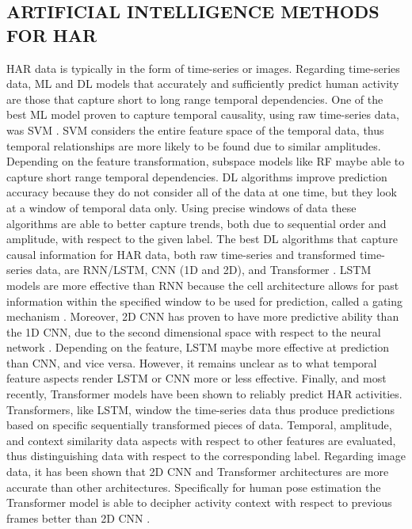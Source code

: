\documentclass{ieeeaccess}
\begin{document}
\subsection{ARTIFICIAL INTELLIGENCE METHODS FOR HAR}
HAR data is typically in the form of time-series or images. Regarding time-series data, ML and DL models that accurately and sufficiently predict human activity are those that capture short to long range temporal dependencies.  One of the best ML model proven to capture temporal causality, using raw time-series data, was SVM \cite{Anguita_2012_SVMHumanActivity, Xiao_2003_DeepLearning}. SVM considers the entire feature space of the temporal data, thus temporal relationships are more likely to be found due to similar amplitudes. Depending on the feature transformation, subspace models like RF maybe able to capture short range temporal dependencies. DL  algorithms improve prediction accuracy because they do not consider all of the data at one time, but they look at a window of temporal data only. Using precise windows of data these algorithms are able to better capture trends, both due to sequential order and amplitude, with respect to the given label.  The best DL algorithms that capture causal information for HAR data, both raw time-series and transformed time-series data, are RNN/LSTM, CNN (1D and 2D), and Transformer \cite{Xiao_2003_DeepLearning, Xia_2020_LSTMCNN, Dirgova_2022_Wearable}. LSTM models are more effective than RNN because the cell architecture allows for past information within the specified window to be used for prediction, called a gating mechanism \cite{Sarang_2021_Tensorflow2}.  Moreover, 2D CNN has proven to have more predictive ability than the 1D CNN, due to the second dimensional space with respect to the neural network \cite{Nedorubova_2021_CWT_CNN_HumanActivity}. Depending on the feature, LSTM maybe more effective at prediction than CNN, and vice versa.  However, it remains unclear as to what temporal feature aspects render LSTM or CNN more or less effective. Finally, and most recently, Transformer models have been shown to reliably predict HAR activities.  Transformers, like LSTM, window the time-series data thus produce predictions based on specific sequentially transformed pieces of data.  Temporal, amplitude, and context similarity data aspects with respect to other features are evaluated, thus distinguishing data with respect to the corresponding label. Regarding image data, it has been shown that 2D CNN and Transformer architectures are more accurate than other architectures. Specifically for human pose estimation the Transformer model is able to decipher activity context with respect to previous frames better than 2D CNN \cite{Mazzia_2022_ActionTransformer}. 
\end{document}
